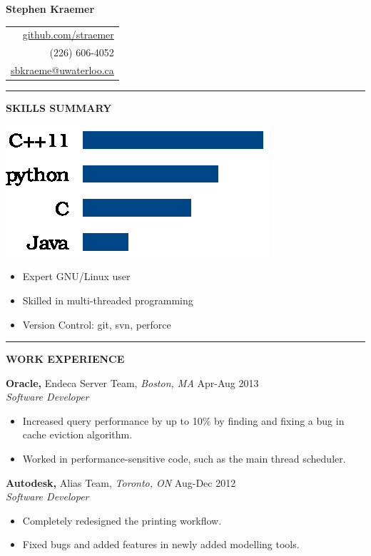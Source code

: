 \documentclass{letter}
\begin{document}
{\Huge\bf Stephen Kraemer} \hfill
\begin{tabular}{r}
  \href{https://github.com/straemer}{github.com/straemer} \\
  (226) 606-4052 \\
  \href{mailto:sbkraeme@uwaterloo.ca}{sbkraeme@uwaterloo.ca}
\end{tabular}

\vskip 2pt
\hrule

{\large\bf SKILLS SUMMARY}

\begin{minipage}{0.35\textwidth}
  \includegraphics{programming_languages.eps}
\end{minipage}
\begin{minipage}{0.65\textwidth}
  \begin{itemize}
    \item Expert GNU/Linux user
    \item Skilled in multi-threaded programming
    \item Version Control: git, svn, perforce
  \end{itemize}
\end{minipage}

\vskip 2pt
\hrule
{\large\bf WORK EXPERIENCE}

{\bf Oracle,} Endeca Server Team, {\sl Boston, MA} \hfill Apr-Aug 2013 \\
{\sl Software Developer}
\begin{itemize}
  \item Increased query performance by up to 10\% by finding and fixing a bug in cache eviction algorithm.
  \item Worked in performance-sensitive code, such as the main thread scheduler.
\end{itemize}

{\bf Autodesk,} Alias Team, {\sl Toronto, ON} \hfill Aug-Dec 2012 \\
{\sl Software Developer}
\begin{itemize}
  \item Completely redesigned the printing workflow.
  \item Fixed bugs and added features in newly added modelling tools.
\end{itemize}
\end{document}
